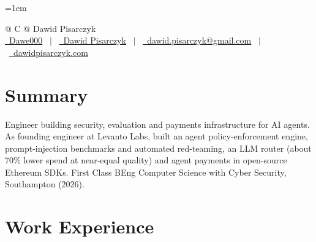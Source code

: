 \documentclass[a4paper,11pt]{article}
\begin{document}
\pagestyle{empty}
\emergencystretch=1em


\begin{tabularx}{\linewidth}{@{} C @{} }
\Huge{Dawid Pisarczyk} \\[7.5pt]
\href{https://github.com/Dawe000}{\raisebox{-0.05\height}\faGithub\ Dawe000} \ $|$ \
\href{https://www.linkedin.com/in/dawid-pisarczyk-657850147/}{\raisebox{-0.05\height}\faLinkedin\ Dawid Pisarczyk} \ $|$ \
\href{mailto:dawid.pisarczyk@gmail.com}{\raisebox{-0.05\height}\faEnvelope\ dawid.pisarczyk@gmail.com} \ $|$ \
\href{https://dawidpisarczyk.com}{\raisebox{-0.05\height}\faGlobe\ dawidpisarczyk.com} \\
\end{tabularx}


\section{Summary}
Engineer building security, evaluation and payments infrastructure for AI agents. As founding engineer at Levanto Labs, built an agent policy-enforcement engine, prompt-injection benchmarks and automated red-teaming, an LLM router (about 70\% lower spend at near-equal quality) and agent payments in open-source Ethereum SDKs. First Class BEng Computer Science with Cyber Security, Southampton (2026).


\section{Work Experience}
\end{document}
